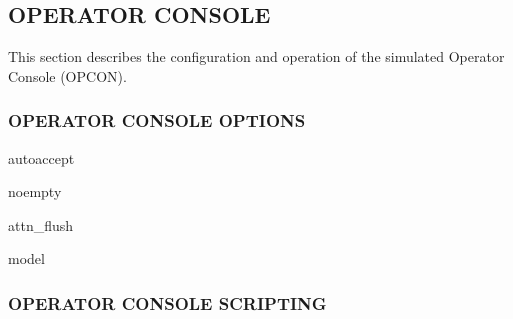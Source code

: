 \subsection[Operator Console]{OPERATOR CONSOLE}

This section describes the configuration and operation of the simulated Operator Console (OPCON).

\subsubsection[Operator Console Options]{OPERATOR CONSOLE OPTIONS}

autoaccept

noempty

attn\_flush

model


\subsubsection[Operator Console Scripting]{OPERATOR CONSOLE SCRIPTING}
